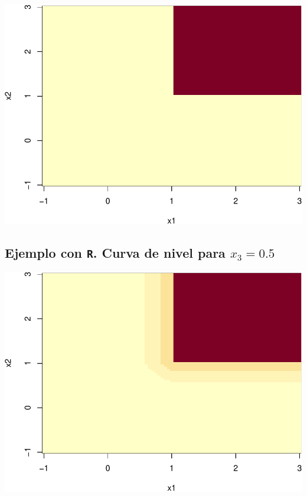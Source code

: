 \documentclass[]{book}
\begin{document}
\begin{center}\includegraphics{curso-probabilidad-udemy_files/figure-latex/unnamed-chunk-154-1} \end{center}

\hypertarget{ejemplo-con-r.-curva-de-nivel-para-x_30.5}{%
\subsection{\texorpdfstring{Ejemplo con \texttt{R}. Curva de nivel para \(x_3=0.5\)}{Ejemplo con R. Curva de nivel para x\_3=0.5}}\label{ejemplo-con-r.-curva-de-nivel-para-x_30.5}}

\begin{center}\includegraphics{curso-probabilidad-udemy_files/figure-latex/unnamed-chunk-155-1} \end{center}
\end{document}
